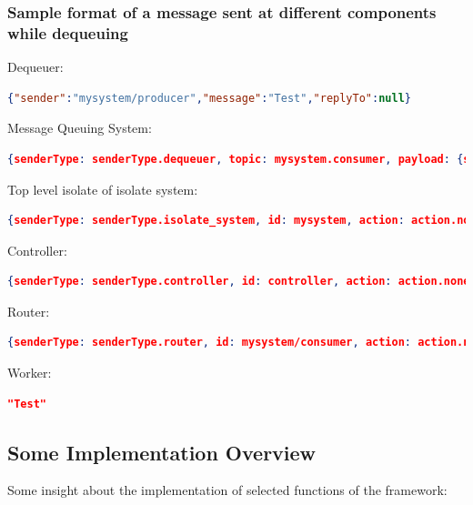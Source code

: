 \subsubsection{Sample format of a message sent at different components while dequeuing}
\begin{description}
\item Dequeuer:
\begin{lstlisting}[language=json,numbers=none]
{"sender":"mysystem/producer","message":"Test","replyTo":null}
\end{lstlisting}

\item Message Queuing System:
\begin{lstlisting}[language=json,numbers=none]
{senderType: senderType.dequeuer, topic: mysystem.consumer, payload: {sender: mysystem/producer, message: Test, replyTo: null}
\end{lstlisting}

\item Top level isolate of isolate system:
\begin{lstlisting}[language=json,numbers=none]
{senderType: senderType.isolate_system, id: mysystem, action: action.none, payload: {to: mysystem/consumer, message: {sender: mysystem/producer, message: Test, replyTo: null}}}
\end{lstlisting}

\item Controller:
\begin{lstlisting}[language=json,numbers=none]
{senderType: senderType.controller, id: controller, action: action.none, payload: {to: mysystem/consumer, message: {sender: mysystem/producer, message: Test, replyTo: null}}}
\end{lstlisting}

\item Router:
\begin{lstlisting}[language=json,numbers=none]
{senderType: senderType.router, id: mysystem/consumer, action: action.none, payload: {sender: mysystem/producer, message: Test, replyTo: null}}
\end{lstlisting}

\item Worker:
\begin{lstlisting}[language=json,numbers=none]
"Test"
\end{lstlisting}

\end{description}

\subsection{Some Implementation Overview}
  Some insight about the implementation of selected functions of the framework:

